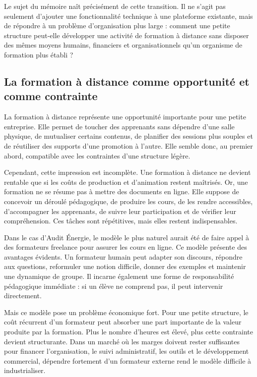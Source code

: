 Le sujet du mémoire naît précisément de cette transition. Il ne s'agit pas seulement
d'ajouter une fonctionnalité technique à une plateforme existante, mais de répondre à un
problème d'organisation plus large : comment une petite structure peut-elle développer
une activité de formation à distance sans disposer des mêmes moyens humains, financiers
et organisationnels qu'un organisme de formation plus établi ?

\subsection{La formation à distance comme opportunité et comme contrainte}

La formation à distance représente une opportunité importante pour une petite entreprise.
Elle permet de toucher des apprenants sans dépendre d'une salle physique, de mutualiser
certains contenus, de planifier des sessions plus souples et de réutiliser des supports d'une
promotion à l'autre. Elle semble donc, au premier abord, compatible avec les contraintes
d'une structure légère.

Cependant, cette impression est incomplète. Une formation à distance ne devient rentable
que si les coûts de production et d'animation restent maîtrisés. Or, une formation ne se
résume pas à mettre des documents en ligne. Elle suppose de concevoir un déroulé
pédagogique, de produire les cours, de les rendre accessibles, d'accompagner les
apprenants, de suivre leur participation et de vérifier leur compréhension. Ces tâches sont
répétitives, mais elles restent indispensables.

Dans le cas d'Audit Énergie, le modèle le plus naturel aurait été de faire appel à des
formateurs freelance pour assurer les cours en ligne. Ce modèle présente des avantages
évidents. Un formateur humain peut adapter son discours, répondre aux questions,
reformuler une notion difficile, donner des exemples et maintenir une dynamique de
groupe. Il incarne également une forme de responsabilité pédagogique immédiate : si un
élève ne comprend pas, il peut intervenir directement.

Mais ce modèle pose un problème économique fort. Pour une petite structure, le coût
récurrent d'un formateur peut absorber une part importante de la valeur produite par la
formation. Plus le nombre d'heures est élevé, plus cette contrainte devient structurante.
Dans un marché où les marges doivent rester suffisantes pour financer l'organisation, le
suivi administratif, les outils et le développement commercial, dépendre fortement d'un
formateur externe rend le modèle difficile à industrialiser.

